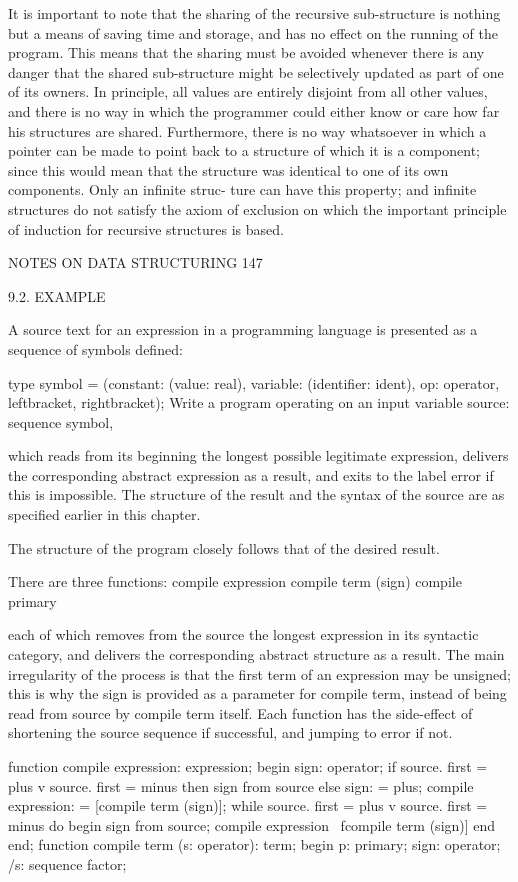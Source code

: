 {{		It is important to note that the sharing of the recursive sub-structure is nothing but a means of saving time and storage, and has no effect on the running of the program. This means that the sharing must be avoided whenever there is any danger that the shared sub-structure might be selectively updated as part of one of its owners. In principle, all values are entirely disjoint from all other values, and there is no way in which the programmer could either know or care how far his structures are shared. Furthermore, there is no way whatsoever in which a pointer can be made to point back to a structure of which it is a component; since this would mean that the structure was identical to one of its own components. Only an infinite struc- ture can have this property; and infinite structures do not satisfy the axiom of exclusion on which the important principle of induction for recursive structures is based.
		
		NOTES ON DATA STRUCTURING 147
		
		9.2. EXAMPLE
		
		A source text for an expression in a programming language is presented as a sequence of symbols defined:
		
		type symbol = (constant: (value: real), variable: (identifier: ident), op: operator, leftbracket, rightbracket); Write a program operating on an input variable source: sequence symbol,
		
		which reads from its beginning the longest possible legitimate expression, delivers the corresponding abstract expression as a result, and exits to the label error if this is impossible. The structure of the result and the syntax of the source are as specified earlier in this chapter.
		
		The structure of the program closely follows that of the desired result.
		
		There are three functions: compile expression compile term (sign) compile primary
		
		each of which removes from the source the longest expression in its syntactic category, and delivers the corresponding abstract structure as a result. The main irregularity of the process is that the first term of an expression may be unsigned; this is why the sign is provided as a parameter for compile term, instead of being read from source by compile term itself. Each function has the side-effect of shortening the source sequence if successful, and jumping to error if not.
		
		function compile expression: expression; begin sign: operator; if source. first = plus v source. first = minus then sign from source else sign: = plus; compile expression: = [compile term (sign)]; while source. first = plus v source. first = minus do begin sign from source; compile expression ~fcompile term (sign)] end end; function compile term (s: operator): term; begin p: primary; sign: operator; /s: sequence factor;
		
}}

